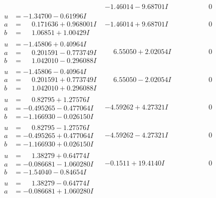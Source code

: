 \documentclass[1p]{elsarticle_modified}
\theoremstyle{definition}
\begin{document}
$$\begin{array}{c|c|c}
 & -1.46014 - 9.68701 I & \phantom{-0.000000 } 0 \\ \hline\begin{aligned}
u &= -1.34700 - 0.61996 I \\
a &= \phantom{-}0.171636 + 0.968001 I \\
b &= \phantom{-}1.06851 + 1.00429 I\end{aligned}
 & -1.46014 + 9.68701 I & \phantom{-0.000000 } 0 \\ \hline\begin{aligned}
u &= -1.45806 + 0.40964 I \\
a &= \phantom{-}0.201591 - 0.773749 I \\
b &= \phantom{-}1.042010 - 0.296088 I\end{aligned}
 & \phantom{-}6.55050 + 2.02054 I & \phantom{-0.000000 } 0 \\ \hline\begin{aligned}
u &= -1.45806 - 0.40964 I \\
a &= \phantom{-}0.201591 + 0.773749 I \\
b &= \phantom{-}1.042010 + 0.296088 I\end{aligned}
 & \phantom{-}6.55050 - 2.02054 I & \phantom{-0.000000 } 0 \\ \hline\begin{aligned}
u &= \phantom{-}0.82795 + 1.27576 I \\
a &= -0.495265 - 0.477064 I \\
b &= -1.166930 - 0.026150 I\end{aligned}
 & -4.59262 + 4.27321 I & \phantom{-0.000000 } 0 \\ \hline\begin{aligned}
u &= \phantom{-}0.82795 - 1.27576 I \\
a &= -0.495265 + 0.477064 I \\
b &= -1.166930 + 0.026150 I\end{aligned}
 & -4.59262 - 4.27321 I & \phantom{-0.000000 } 0 \\ \hline\begin{aligned}
u &= \phantom{-}1.38279 + 0.64774 I \\
a &= -0.086681 - 1.060280 I \\
b &= -1.54040 - 0.84654 I\end{aligned}
 & -0.1511 + 19.4140 I & \phantom{-0.000000 } 0 \\ \hline\begin{aligned}
u &= \phantom{-}1.38279 - 0.64774 I \\
a &= -0.086681 + 1.060280 I \\

\end{aligned}
\end{array}$$
\end{document}
